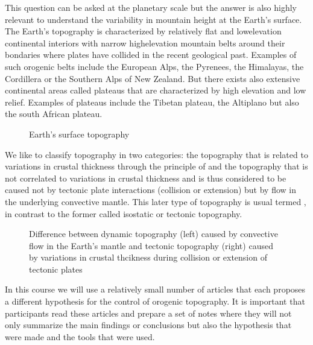 \documentclass[letterpaper,10pt,english]{jupyterBook}
\let\sphinxpxdimen\pdfpxdimen\else\newdimen\sphinxpxdimen
\begin{document}
\sphinxAtStartPar
This question can be asked at the planetary scale but the answer is also highly relevant to understand the variability in mountain height at the Earth’s surface. The Earth’s topography is characterized by relatively flat and low\sphinxhyphen{}elevation continental interiors with narrow high\sphinxhyphen{}elevation mountain belts around their bondaries where plates have collided in the recent geological past. Examples of such orogenic belts include the European Alps, the Pyrenees, the Himalayas, the Cordillera or the Southern Alps of New Zealand. But there exists also extensive continental areas called plateaus that are characterized by high elevation and low relief. Examples of plateaus include the Tibetan plateau, the Altiplano but also the south African plateau.

\begin{figure}[htbp]
\centering
\capstart

\noindent\sphinxincludegraphics[height=300\sphinxpxdimen]{{worldtopo}.png}
\caption{Earth’s surface topography}\label{\detokenize{intro:worldtopo}}\end{figure}

\sphinxAtStartPar
We like to classify topography in two categories: the topography that is related to variations in crustal thickness through the principle of  and the topography that is not correlated to variations in crustal thickness and is thus considered to be caused not by tectonic plate interactions (collision or extension) but by flow in the underlying convective mantle. This later type of topography is usual termed , in contrast to the former called isostatic or tectonic topography.

\begin{figure}[htbp]
\centering
\capstart

\noindent\sphinxincludegraphics[height=400\sphinxpxdimen]{{dynamictopo}.png}
\caption{Difference between dynamic topography (left) caused by convective flow in the Earth’s mantle and tectonic topography (right) caused by variations in crustal thcikness during collision or extension of tectonic plates}\label{\detokenize{intro:dynamictopo}}\end{figure}

\sphinxAtStartPar
In this course we will use a relatively small number of articles that each proposes a different hypothesis for the control of orogenic topography. It is important that participants read these articles and prepare a set of notes where they will not only summarize the main findings or conclusions but also the hypothesis that were made and the tools that were used.
\end{document}

